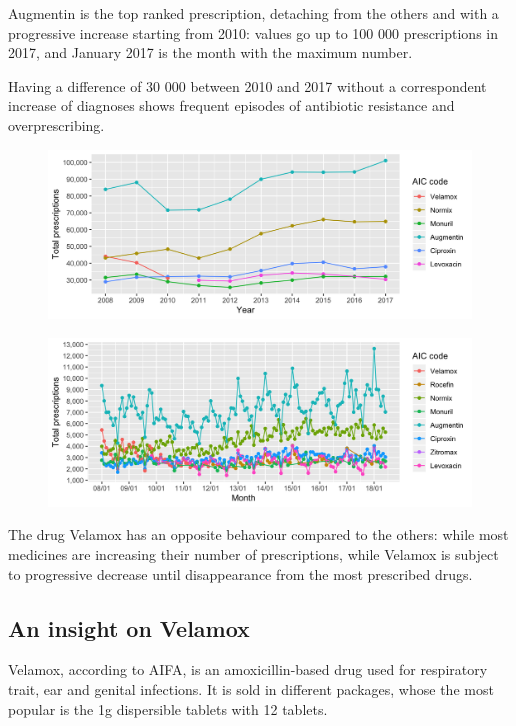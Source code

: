 Augmentin is the top ranked prescription, detaching from the others and with a progressive increase starting from 2010: values go up to 100 000 prescriptions in 2017, and January 2017 is the month with the maximum number.

Having a difference of 30 000 between 2010 and 2017 without a correspondent increase of diagnoses shows frequent episodes of antibiotic resistance and overprescribing.

\begin{figure}[h]
	\centering
	\includegraphics[scale=0.3]{../plots/top_aic-year.png}
\end{figure}

\begin{figure}[h]
	\centering
	\includegraphics[scale=0.3]{../plots/top_aic-month.png}
\end{figure}

The drug Velamox has an opposite behaviour compared to the others: while most medicines are increasing their number of prescriptions, while Velamox is subject to progressive decrease until disappearance from the most prescribed drugs.

\subsection{An insight on Velamox}
Velamox, according to AIFA, is an amoxicillin-based drug used for respiratory trait, ear and genital infections. It is sold in different packages, whose the most popular is the 1g dispersible tablets with 12 tablets.

